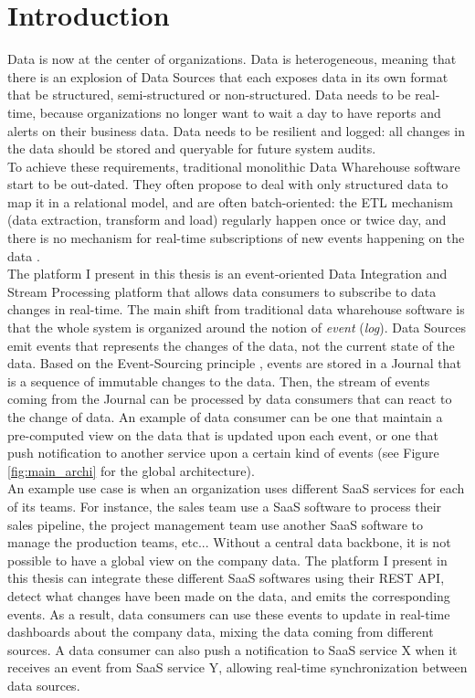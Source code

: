 \chapter{Introduction}

Data is now at the center of organizations. 
Data is heterogeneous, meaning that there is an explosion of Data Sources that each exposes data in its own format 
that be structured, semi-structured or non-structured.
Data needs to be real-time, because organizations no longer want to wait a day to have reports and alerts on their business data.
Data needs to be resilient and logged: all changes in the data should be stored and queryable for future system audits.
\\

To achieve these requirements, traditional monolithic Data Wharehouse software start to be out-dated. They often
propose to deal with only structured data to map it in a relational model, and are often batch-oriented: 
the ETL mechanism (data extraction, transform and load) regularly happen once or twice day, and there is no mechanism 
for real-time subscriptions of new events happening on the data .
\\

The platform I present in this thesis is an event-oriented Data Integration and Stream Processing platform that allows data consumers
to subscribe to data changes in real-time. The main shift from traditional data wharehouse software is that the whole
system is organized around the notion of \textit{event} (\textit{log}). Data Sources emit events that represents the changes 
of the data, not the current state of the data. Based on the Event-Sourcing principle , events
are stored in a Journal that is a sequence of immutable changes to the data. Then, the stream of events coming from the Journal 
can be processed by data consumers that can react to the change of data. An example of data consumer can be one that maintain
a pre-computed view on the data that is updated upon each event, or one that push notification to another service upon a certain
kind of events (see Figure \ref{fig:main_archi} for the global architecture).
\\

An example use case is when an organization uses different SaaS services for each of its teams. For instance, the sales
team use a SaaS software to process their sales pipeline, the project management team use another SaaS software to manage
the production teams, etc... Without a central data backbone, it is not possible to have a global view on the company data.
The platform I present in this thesis can integrate these different SaaS softwares using their REST API, detect what
changes have been made on the data, and emits the corresponding events. As a result, data consumers can use these events
to update in real-time dashboards about the company data, mixing the data coming from different sources. A data consumer can also push a
notification to SaaS service X when it receives an event from SaaS service Y, allowing real-time synchronization between
data sources.
\\

